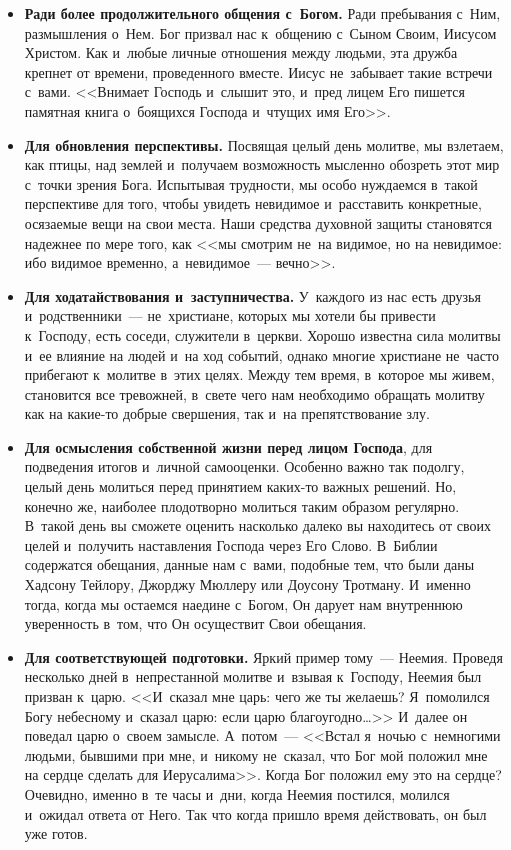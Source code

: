 \documentclass[12pt,article,a4paper,fittopage]{ncc}
\begin{document}
\begin{multicols}{2}
\begin{itemize}
\item \textbf{Ради более продолжительного общения с~Богом.} Ради пребывания с~Ним, размышления о~Нем. Бог призвал нас к~общению с~Сыном Своим, Иисусом Христом. Как и~любые личные отношения между людьми, эта дружба крепнет от времени, проведенного вместе. Иисус не~забывает такие встречи с~вами.  <<Внимает Господь и~слышит это, и~пред лицем Его пишется памятная книга о~боящихся Господа и~чтущих имя Его>>.
\item \textbf{Для обновления перспективы.} Посвящая целый день молитве, мы взлетаем, как птицы, над землей и~получаем возможность мысленно обозреть этот мир с~точки зрения Бога. Испытывая трудности, мы особо нуждаемся в~такой перспективе для того, чтобы увидеть невидимое и~расставить конкретные, осязаемые вещи на свои места. Наши средства духовной защиты становятся надежнее по мере того, как <<мы смотрим не~на видимое, но на невидимое: ибо видимое временно, а~невидимое~--- вечно>>.
\item \textbf{Для ходатайствования и~заступничества.} У~каждого из нас есть друзья и~родственники~--- не~христиане, которых мы хотели бы привести к~Господу, есть соседи, служители в~церкви. Хорошо известна сила молитвы и~ее влияние на людей и~на ход событий, однако многие христиане не~часто прибегают к~молитве в~этих целях. Между тем время, в~которое мы живем, становится все тревожней, в~свете чего нам необходимо обращать молитву как на какие-то добрые свершения, так и~на препятствование злу.
\item \textbf{Для осмысления собственной жизни перед лицом Господа}, для подведения итогов и~личной самооценки. Особенно важно так подолгу, целый день молиться перед принятием каких-то важных решений. Но, конечно же, наиболее плодотворно молиться таким образом регулярно. В~такой день вы сможете оценить насколько далеко вы находитесь от своих целей и~получить наставления Господа через Его Слово. В~Библии содержатся обещания, данные нам с~вами, подобные тем, что были даны Хадсону Тейлору, Джорджу Мюллеру или Доусону Тротману. И~именно тогда, когда мы остаемся наедине с~Богом, Он дарует нам внутреннюю уверенность в~том, что Он осуществит Свои обещания.
\item \textbf{Для соответствующей подготовки.} Яркий пример тому~--- Неемия. Проведя несколько дней в~непрестанной молитве и~взывая к~Господу, Неемия был призван к~царю. <<И~сказал мне царь: чего же ты желаешь? Я~помолился Богу небесному и~сказал царю: если царю благоугодно\ldots>> И~далее он поведал царю о~своем замысле. А~потом~--- <<Встал я~ночью с~немногими людьми, бывшими при мне, и~никому не~сказал, что Бог мой положил мне на сердце сделать для Иерусалима>>. Когда Бог положил ему это на сердце? Очевидно, именно в~те часы и~дни, когда Неемия постился, молился и~ожидал ответа от Него. Так что когда пришло время действовать, он был уже готов.
\end{itemize}


\end{multicols}
\end{document}
